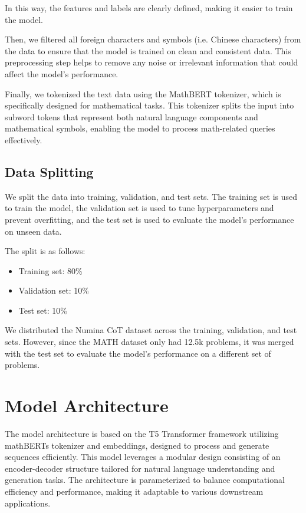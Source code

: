 \documentclass{article}
\begin{document}
In this way, the features and labels are clearly defined, making it easier to train the model. 

Then, we filtered all foreign characters and symbols (i.e. Chinese characters) from the data to ensure that the model is trained on clean and consistent data. This preprocessing step helps to remove any noise or irrelevant information that could affect the model's performance.

Finally, we tokenized the text data using the MathBERT tokenizer, which is specifically designed for mathematical tasks. This tokenizer splits the input into subword tokens that represent both natural language components and mathematical symbols, enabling the model to process math-related queries effectively.

\subsection{Data Splitting}
We split the data into training, validation, and test sets. The training set is used to train the model, the validation set is used to tune hyperparameters and prevent overfitting, and the test set is used to evaluate the model's performance on unseen data.

The split is as follows:
\begin{itemize}
  \item Training set: 80\%
  \item Validation set: 10\%
  \item Test set: 10\%
\end{itemize}

We distributed the Numina CoT dataset across the training, validation, and test sets. However, since the MATH dataset only had 12.5k problems, it was merged with the test set to evaluate the model's performance on a different set of problems.

\section{Model Architecture}

The model architecture is based on the T5 Transformer framework utilizing mathBERTs tokenizer and embeddings, designed to process and generate sequences efficiently. This model leverages a modular design consisting of an encoder-decoder structure tailored for natural language understanding and generation tasks. The architecture is parameterized to balance computational efficiency and performance, making it adaptable to various downstream applications.
\end{document}
